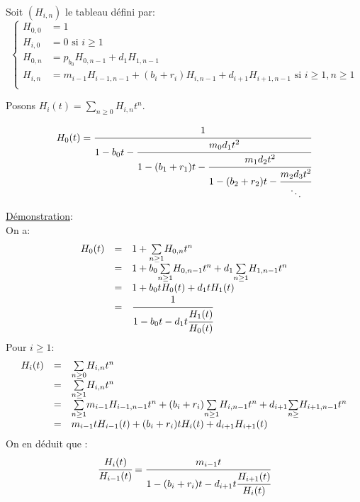 		\begin{definition}
			\begin{rm}
				Soit $(H_{i,n})$ le tableau défini  par:
				\[
				\begin{cases}
					H_{0,0}&=1\\
					H_{i,0}&=0 \text{ si }i\geq 1\\
					H_{0,n}&=p_{b_{0}}H_{0,n-1}+d_{1}H_{1,n-1}\\
					H_{i,n}&=m_{i-1}H_{i-1,n-1}+(b_{i}+r_{i})H_{i,n-1}+d_{i+1}H_{i+1,n-1} \text{ si }i\geq1,n\geq1\\
				\end{cases}
				\]
			\end{rm}
		\end{definition}
		Posons $H_{i}(t)=\underset{n\geq0}{\sum}H_{i,n}t^n$.

		\begin{proposition}
			\[
				\begin{array}{r c l}
					H_{0}(t)=\cfrac{1}{1-b_{0}t-\cfrac{m_{0}d_{1}t^2}{1-(b_{1}+r_{1})t-\cfrac{m_{1}d_{2}t^2}{1-(b_{2}+r_{2})t-\cfrac{m_{2}d_{3}t^2}{\ddots}}}}
				\end{array}
			\]
		\end{proposition}
		\underline{Démonstration}:\\
			On a:\\
			$$
				\begin{array}{r c l}
					H_{0}(t)&=&1+\underset{n\geq1}{\sum}H_{0,n}t^n\\
					&=&1+b_{0}\underset{n\geq1}{\sum}H_{0,n-1}t^n+d_{1}\underset{n\geq1}{\sum}H_{1,n-1}t^n\\
					&=&1+b_{0}tH_{0}(t)+d_{1}tH_{1}(t)\\
					&=&\cfrac{1}{1-b_{0}t-d_{1}t\cfrac{H_{1}(t)}{H_{0}(t)}}
				\end{array}
			$$
			Pour $i\geq1$:
			\[
				\begin{array}{r c l}
					H_{i}(t)&=&\underset{n\geq0}{\sum}H_{i,n}t^n\\
					&=&	\underset{n\geq1}{\sum}H_{i,n}t^n\\
					&=&\underset{n\geq1}{\sum}m_{i-1}H_{i-1,n-1}t^n+(b_{i}+r_{i})\underset{n\geq1}{\sum}H_{i,n-1}t^n+d_{i+1}\underset{n\geq}{\sum}H_{i+1,n-1}t^n\\
					&=&m_{i-1}tH_{i-1}(t)+(b_{i}+r_{i})tH_{i}(t)+d_{i+1}H_{i+1}(t)
				\end{array}
			\]
			On en déduit que :\\
			\[
				\cfrac{H_{i}(t)}{H_{i-1}(t)}=\cfrac{m_{i-1}t}{1-(b_{i}+r_{i})t-d_{i+1}t\cfrac{H_{i+1}(t)}{H_{i}(t)}}
			\]
